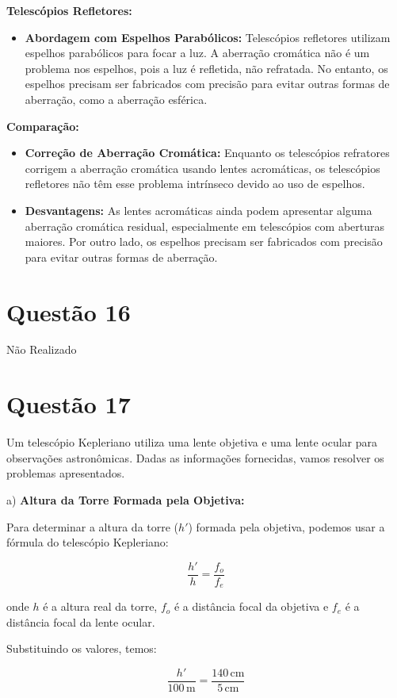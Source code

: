 \documentclass[a4paper, 12pt]{article}
\begin{document}
\textbf{Telescópios Refletores:}
\begin{itemize}
    \item \textbf{Abordagem com Espelhos Parabólicos:} Telescópios refletores utilizam espelhos parabólicos para focar a luz. A aberração cromática não é um problema nos espelhos, pois a luz é refletida, não refratada. No entanto, os espelhos precisam ser fabricados com precisão para evitar outras formas de aberração, como a aberração esférica.
\end{itemize}

\textbf{Comparação:}
\begin{itemize}
    \item \textbf{Correção de Aberração Cromática:} Enquanto os telescópios refratores corrigem a aberração cromática usando lentes acromáticas, os telescópios refletores não têm esse problema intrínseco devido ao uso de espelhos.
    \item \textbf{Desvantagens:} As lentes acromáticas ainda podem apresentar alguma aberração cromática residual, especialmente em telescópios com aberturas maiores. Por outro lado, os espelhos precisam ser fabricados com precisão para evitar outras formas de aberração.
\end{itemize}

\section*{Questão 16}
Não Realizado
\section*{Questão 17}
Um telescópio Kepleriano utiliza uma lente objetiva e uma lente ocular para observações astronômicas. Dadas as informações fornecidas, vamos resolver os problemas apresentados.

a) \textbf{Altura da Torre Formada pela Objetiva:}

Para determinar a altura da torre (\(h'\)) formada pela objetiva, podemos usar a fórmula do telescópio Kepleriano:

\[
\frac{h'}{h} = \frac{f_o}{f_e}
\]

onde \(h\) é a altura real da torre, \(f_o\) é a distância focal da objetiva e \(f_e\) é a distância focal da lente ocular.

Substituindo os valores, temos:

\[
\frac{h'}{100 \, \text{m}} = \frac{140 \, \text{cm}}{5 \, \text{cm}}
\]
\end{document}

